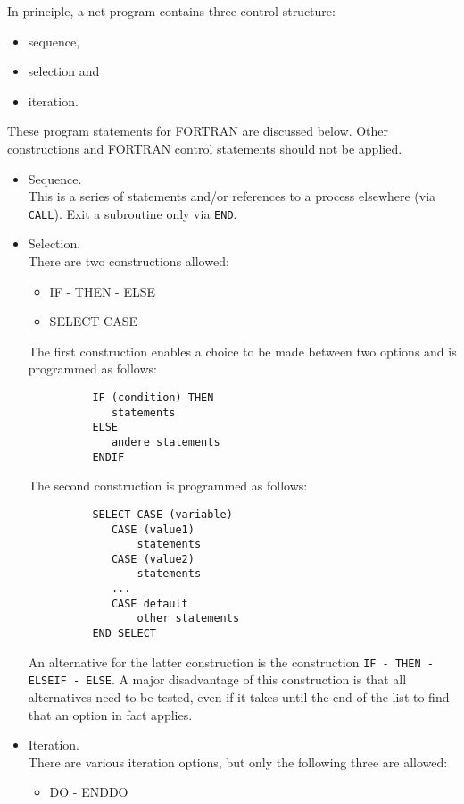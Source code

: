 \documentclass[12pt]{book}
\begin{document}
In principle, a net program contains three control structure:
\begin{itemize}
  \item sequence,
  \item selection and
  \item iteration.
\end{itemize}
These program statements for FORTRAN are discussed below. Other constructions and FORTRAN
control statements should not be applied.
\\[2ex]
\noindent
\begin{itemize}
  \item Sequence. \\
        This is a series of statements and/or references to a process elsewhere (via {\tt CALL}).
        Exit a subroutine only via {\tt END}.
  \item Selection. \\
        There are two constructions allowed:
        \begin{itemize}
           \item IF - THEN - ELSE
           \item SELECT CASE
        \end{itemize}
        The first construction enables a choice to be made between two options and is programmed as follows:
        \begin{verbatim}
          IF (condition) THEN
             statements
          ELSE
             andere statements
          ENDIF
        \end{verbatim}
        The second construction is programmed as follows:
        \begin{verbatim}
          SELECT CASE (variable)
             CASE (value1)
                 statements
             CASE (value2)
                 statements
             ...
             CASE default
                 other statements
          END SELECT
        \end{verbatim}
        An alternative for the latter construction is the construction {\tt IF - THEN - ELSEIF - ELSE}.
        A major disadvantage of this construction is that all alternatives need to be tested, even if it takes
        until the end of the list to find that an option in fact applies.
  \item Iteration. \\
        There are various iteration options, but only the following three are allowed:
        \begin{itemize}
           \item DO - ENDDO

\end{itemize}
\end{itemize}
\end{document}
